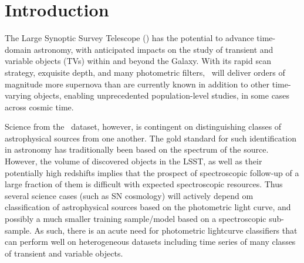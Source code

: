 \section{Introduction}
\label{sec:intro}


The Large Synoptic Survey Telescope (\lsst) has the potential to advance time-domain astronomy, with anticipated impacts on the study of transient and variable objects (TVs) within and beyond the Galaxy.
With its rapid scan strategy, exquisite depth, and many photometric filters, \lsst\ will deliver orders of magnitude more supernova than are currently known in addition to  other time-varying objects, enabling unprecedented population-level studies, in some cases across cosmic time.

Science from the \lsst\ dataset, however, is contingent on distinguishing classes of astrophysical sources
 from one another. The gold standard for such identification in astronomy has traditionally been
based on the spectrum of the source. However, the volume of discovered objects in the LSST, as well as their potentially high redshifts implies that the prospect of spectroscopic follow-up of a large fraction of them is difficult
with expected spectroscopic resources. Thus several science cases (such as SN cosmology) will actively depend om classification of astrophysical sources based on the photometric light curve, and possibly a much smaller training sample/model based on a spectroscopic sub-sample. 
As such, there is an acute need for photometric lightcurve classifiers that can perform well on  heterogeneous datasets including time series of many classes of transient and variable objects.

